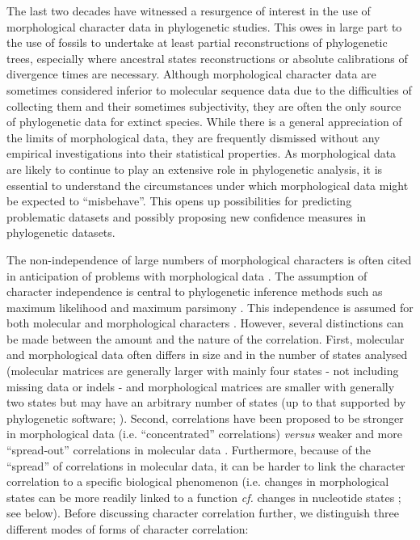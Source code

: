 \documentclass[12pt,letterpaper]{article}
\begin{document}
The last two decades have witnessed a resurgence of interest in the use of morphological character data in phylogenetic studies.
This owes in large part to the use of fossils to undertake at least partial reconstructions of phylogenetic trees, especially where ancestral states reconstructions or absolute calibrations of divergence times are necessary. 
Although morphological character data are sometimes considered inferior to molecular sequence data due to the difficulties of collecting them and their sometimes subjectivity, they are often the only source of phylogenetic data for extinct species.
While there is a general appreciation of the limits of morphological data, they are frequently dismissed without any empirical investigations into their statistical properties.
As morphological data are likely to continue to play an extensive role in phylogenetic analysis, it is essential to understand the circumstances under which morphological data might be expected to ``misbehave''.
This opens up possibilities for predicting problematic datasets and possibly proposing new confidence measures in phylogenetic datasets.

The non-independence of large numbers of morphological characters is often cited in anticipation of problems with morphological data \cite[e.g.][]{Davalos01072014, ZouConvergence}.
The assumption of character independence is central to phylogenetic inference methods such as maximum likelihood and maximum parsimony \citep[e.g.][]{joysey1982problems,felsenstein1985phylogenies,lewisa2001,felsenstein2004inferring}.
This independence is assumed for both molecular and morphological characters \citep{huelsenbeck1999effect,Davalos01072014,ZouConvergence}.
However, several distinctions can be made between the amount and the nature of the correlation.
First, molecular and morphological data often differs in size and in the number of states analysed (molecular matrices are generally larger with mainly four states - not including missing data or indels - and morphological matrices are smaller with generally two states but may have an arbitrary number of states (up to that supported by phylogenetic software; \citealt{Guillerme2016146}).
Second, correlations have been proposed to be stronger in morphological data (i.e. ``concentrated'' correlations) \textit{versus} weaker and more ``spread-out'' correlations in molecular data \citep[i.e. ``diffused'' correlations - though some regions of the genome may be thought as more correlated than others][]{huelsenbeck1999effect}.
Furthermore, because of the ``spread'' of correlations in molecular data, it can be harder to link the character correlation to a specific biological phenomenon (i.e. changes in morphological states can be more readily linked to a function \textit{cf.} changes in nucleotide states ; see below).
Before discussing character correlation further, we distinguish three different modes of forms of character correlation:
\end{document}
